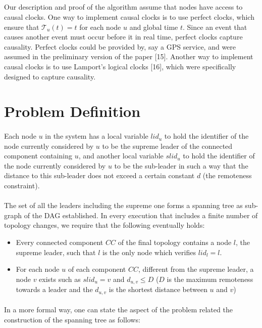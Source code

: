 \subparagraph{}Our description and proof of the algorithm assume that nodes have access to causal clocks. One way to implement causal clocks is to use perfect clocks, which ensure that $\mathcal{T}_u(t) = t$ for each node $u$ and global time $t$. Since an event that causes another event must occur before it in real time, perfect clocks capture causality. Perfect clocks could be provided by, say a GPS service, and were assumed in the preliminary version of the paper [15]. Another way to implement causal clocks is to use Lamport’s logical clocks [16], which were specifically designed to capture causality.
\newpage
\section{Problem Definition}
\paragraph{}Each node $u$ in the system has a local variable $lid_{u}$ to hold the identifier of the node currently considered by $u$ to be the supreme leader of the connected component containing $u$, and another local variable $slid_u$ to hold the identifier of the node currently considered by $u$ to be the sub-leader in such a way that the distance to this sub-leader does not exceed a certain constant $d$ (the remoteness constraint).
\paragraph{}The set of all the leaders including the supreme one forms a spanning tree as sub-graph of the DAG established.
In every execution that includes a finite number of topology changes, we require that the following eventually holds:
\begin{itemize}
	\item Every connected component $CC$ of the final topology contains a node $l$, the supreme leader, such that $l$ is the only node which verifies $ lid_{l} = l $.
	\item For each node $u$ of each component $CC$, different from the supreme leader, a node $v$ exists such as $slid_{u} = v$ and $d_{u,v} \leq D$ ($D$ is the maximum remoteness towards a leader and the $ d_{u,v} $ is the shortest distance between $u$ and $v$)
\end{itemize}

\paragraph{}In a more formal way, one can state the aspect of the problem related the construction of the spanning tree as follows:

